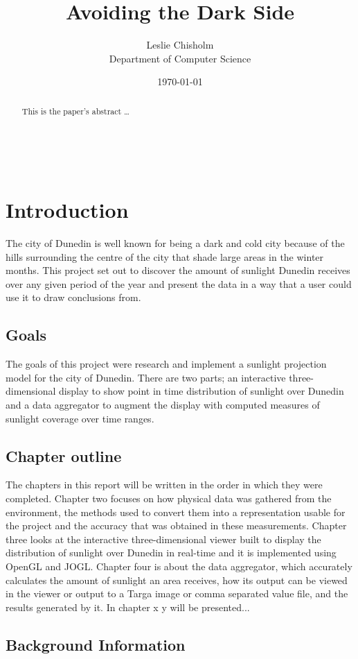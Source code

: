 \documentclass[12pt]{report}
\title{Avoiding the Dark Side}
\author{
        Leslie Chisholm \\
                Department of Computer Science\\
}
\date{\today}
\begin{document}
\maketitle

\begin{abstract}
This is the paper's abstract \ldots
\end{abstract}

\tableofcontents
\listoffigures\
\listofalgorithms
\chapter{Introduction}
The city of Dunedin is well known for being a dark and cold city because of the hills surrounding the centre of the city that shade large areas in the winter months. This project set out to discover the amount of sunlight Dunedin receives over any given period of the year and present the data in a way that a user could use it to draw conclusions from.

\section{Goals}
The goals of this project were research and implement a sunlight projection model for the city of Dunedin. There are two parts; an interactive three-dimensional display to show point in time distribution of sunlight over Dunedin and a data aggregator to augment the display with computed measures of sunlight coverage over time ranges.

\section{Chapter outline}
The chapters in this report will be written in the order in which they were completed. Chapter two focuses on how physical data was gathered from the environment, the methods used to convert them into a representation usable for the project and the accuracy that was obtained in these measurements. Chapter three looks at the interactive three-dimensional viewer built to display the distribution of sunlight over Dunedin in real-time and it is implemented using OpenGL and JOGL. Chapter four is about the data aggregator, which accurately calculates the amount of sunlight an area receives, how its output can be viewed in the viewer or output to a Targa image or comma separated value file, and the results generated by it.
In chapter x y will be presented...

\section{Background Information}
\end{document}
